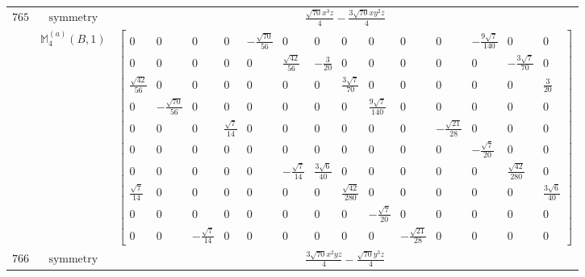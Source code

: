 \documentclass[fleqn,8pt,landscape]{jsarticle}
\begin{document}
\begin{longtable}{ccc}
$ 765 $ & $ \text{symmetry} $ & $ \frac{\sqrt{70} x^{3} z}{4} - \frac{3 \sqrt{70} x y^{2} z}{4} $ \\
$  $ & $ \mathbb{M}_{4}^{(a)}(B,1) $ & $ \begin{bmatrix} 0 & 0 & 0 & 0 & - \frac{\sqrt{70}}{56} & 0 & 0 & 0 & 0 & 0 & 0 & - \frac{9 \sqrt{7}}{140} & 0 & 0 \\ 0 & 0 & 0 & 0 & 0 & \frac{\sqrt{42}}{56} & - \frac{3}{20} & 0 & 0 & 0 & 0 & 0 & - \frac{3 \sqrt{7}}{70} & 0 \\ \frac{\sqrt{42}}{56} & 0 & 0 & 0 & 0 & 0 & 0 & \frac{3 \sqrt{7}}{70} & 0 & 0 & 0 & 0 & 0 & \frac{3}{20} \\ 0 & - \frac{\sqrt{70}}{56} & 0 & 0 & 0 & 0 & 0 & 0 & \frac{9 \sqrt{7}}{140} & 0 & 0 & 0 & 0 & 0 \\ 0 & 0 & 0 & \frac{\sqrt{7}}{14} & 0 & 0 & 0 & 0 & 0 & 0 & - \frac{\sqrt{21}}{28} & 0 & 0 & 0 \\ 0 & 0 & 0 & 0 & 0 & 0 & 0 & 0 & 0 & 0 & 0 & - \frac{\sqrt{7}}{20} & 0 & 0 \\ 0 & 0 & 0 & 0 & 0 & - \frac{\sqrt{7}}{14} & \frac{3 \sqrt{6}}{40} & 0 & 0 & 0 & 0 & 0 & \frac{\sqrt{42}}{280} & 0 \\ \frac{\sqrt{7}}{14} & 0 & 0 & 0 & 0 & 0 & 0 & \frac{\sqrt{42}}{280} & 0 & 0 & 0 & 0 & 0 & \frac{3 \sqrt{6}}{40} \\ 0 & 0 & 0 & 0 & 0 & 0 & 0 & 0 & - \frac{\sqrt{7}}{20} & 0 & 0 & 0 & 0 & 0 \\ 0 & 0 & - \frac{\sqrt{7}}{14} & 0 & 0 & 0 & 0 & 0 & 0 & - \frac{\sqrt{21}}{28} & 0 & 0 & 0 & 0 \end{bmatrix} $ \\ \hline
$ 766 $ & $ \text{symmetry} $ & $ \frac{3 \sqrt{70} x^{2} y z}{4} - \frac{\sqrt{70} y^{3} z}{4} $ \\

\end{longtable}
\end{document}
